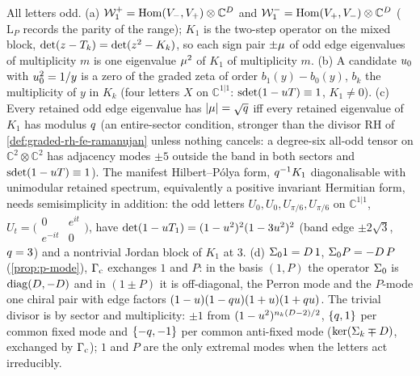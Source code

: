 \begin{proposition}
\label{prop:odd-sector-two-step}
All letters odd. (a) $\mathcal W_1^+ = \operatorname{Hom}(V_-,V_+)\otimes\mathbb C^{D}$ and $\mathcal W_1^- =
\operatorname{Hom}(V_+,V_-)\otimes\mathbb C^{D}$ ($\mathrm L_P$ records the parity of the range); $K_1$ is
the two-step operator on the mixed block, $\det(z-T_k) = \det(z^2-K_k)$, so each sign pair $\pm\mu$
of odd edge eigenvalues of multiplicity $m$ is one eigenvalue $\mu^2$ of $K_1$ of multiplicity $m$.
(b) A candidate $u_0$ with $u_0^2 = 1/y$ is a zero of the graded zeta of order $b_1(y)-b_0(y)$,
$b_k$ the multiplicity of $y$ in $K_k$ (four letters $X$ on $\mathbb C^{1|1}$: $\operatorname{sdet}(1-uT)\equiv1$, $K_1\ne0$).
(c) Every retained odd edge eigenvalue has $|\mu| = \sqrt{q}$ iff every retained eigenvalue of $K_1$ has
modulus $q$ (an entire-sector condition, stronger than the divisor RH of \cref{def:graded-rh-fe-ramanujan}
unless nothing cancels: a degree-six all-odd tensor on $\mathbb C^2\otimes\mathbb C^2$ has adjacency
modes $\pm5$ outside the band in both sectors and $\operatorname{sdet}(1-uT)\equiv1$). The manifest Hilbert--P\'olya
form, $q^{-1}K_1$ diagonalisable with unimodular retained spectrum, equivalently a positive invariant
Hermitian form, needs semisimplicity in addition: the odd letters $U_0,U_0,U_{\pi/6},U_{\pi/6}$ on
$\mathbb C^{1|1}$, $U_t = \bigl(\begin{smallmatrix}0&e^{it}\\ e^{-it}&0\end{smallmatrix}\bigr)$,
have $\det(1-uT_1) = (1-u^2)^2(1-3u^2)^2$ (band edge $\pm2\sqrt3$, $q = 3$) and a nontrivial
Jordan block of $K_1$ at $3$.
(d) $\Sigma_01 = D\,1$, $\Sigma_0P = -D\,P$ (\cref{prop:p-mode}), $\Gamma_{\mathrm c}$ exchanges $1$ and $P$: in the basis
$(1,P)$ the operator $\Sigma_0$ is $\operatorname{diag}(D,-D)$ and in $(1\pm P)$ it is off-diagonal, the
Perron mode and the $P$-mode one chiral pair with edge factors $(1-u)(1-qu)(1+u)(1+qu)$. The
trivial divisor is by sector and multiplicity: $\pm1$ from $(1-u^2)^{n_k(D-2)/2}$, $\{q,1\}$ per
common fixed mode and $\{-q,-1\}$ per common anti-fixed mode ($\ker(\Sigma_k\mp D)$, exchanged by $\Gamma_{\mathrm c}$);
$1$ and $P$ are the only extremal modes when the letters act irreducibly.
\end{proposition}

